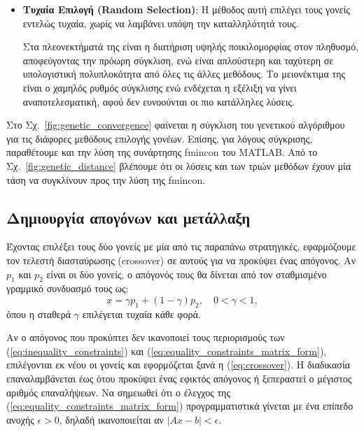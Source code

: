 \documentclass[a4paper,12pt]{article}
\begin{document}
\begin{itemize}
    \item \textbf{Τυχαία Επιλογή (Random Selection)}:
    Η μέθοδος αυτή επιλέγει τους γονείς εντελώς τυχαία, χωρίς να λαμβάνει υπόψη την καταλληλότητά τους.

    Στα πλεονεκτήματά της είναι η διατήριση υψηλής ποικιλομορφίας στον πληθυσμό, αποφεύγοντας την πρόωρη σύγκλιση,
    ενώ είναι απλούστερη και ταχύτερη σε υπολογιστική πολυπλοκότητα από όλες τις άλλες μεθόδους. Το μειονέκτιμα της
    είναι ο χαμηλός ρυθμός σύγκλισης ενώ ενδέχεται η εξέλιξη να γίνει αναποτελεσματική, αφού δεν ευνοούνται οι πιο 
    κατάλληλες λύσεις.
    
\end{itemize}

Στο Σχ.~\ref{fig:genetic_convergence} φαίνεται η σύγκλιση του γενετικού αλγόριθμου για τις διάφορες μεθόδους
επιλογής γονέων. Επίσης, για λόγους σύγκρισης, παραθέτουμε και την λύση της συνάρτησης 
fmincon του MATLAB.
Από το Σχ.~\ref{fig:genetic_distance} βλέπουμε ότι οι λύσεις και των τριών μεθόδων έχουν μία τάση να συγκλίνουν 
προς την λύση της fmincon.

\subsection{Δημιουργία απογόνων και μετάλλαξη}
Έχοντας επιλέξει τους δύο γονείς με μία από τις παραπάνω στρατηγικές, εφαρμόζουμε τον τελεστή διασταύρωσης
(crossover) σε αυτούς για να προκύψει ένας απόγονος. 
Αν $p_1$ και $p_2$ είναι οι δύο γονείς, ο απόγονός τους θα δίνεται από τον σταθμισμένο γραμμικό συνδυασμό τους ως:
\begin{equation}
    x = \gamma p_1 +(1 - \gamma) p_2, \quad 0 < \gamma < 1,
    \label{eq:crossover}
\end{equation}
όπου η σταθερά $\gamma$ επιλέγεται τυχαία κάθε φορά. 

Αν ο απόγονος που προκύπτει δεν ικανοποιεί τους περιορισμούς
των (\ref{eq:inequality_constraints}) και (\ref{eq:equality_constraints_matrix_form}), επιλέγονται εκ νέου οι γονείς
και εφορμόζεται ξανά η (\ref{eq:crossover}). Η διαδικασία επαναλαμβάνεται έως ότου προκύψει ένας εφικτός απόγονος ή
ξεπεραστεί ο μέγιστος αριθμός επαναλήψεων. Να σημειωθεί ότι ο έλεγχος της (\ref{eq:equality_constraints_matrix_form})
προγραμματιστικά γίνεται με ένα επίπεδο ανοχής $\epsilon > 0$, δηλαδή ικανοποιείται αν $|Ax - b| < \epsilon$.
\end{document}
